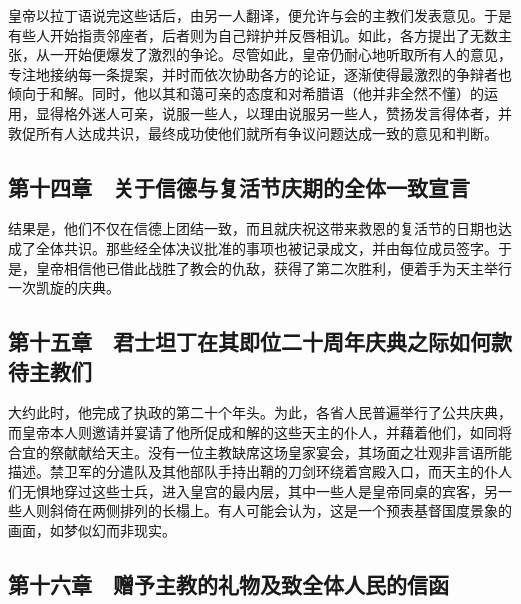 皇帝以拉丁语说完这些话后，由另一人翻译，便允许与会的主教们发表意见。于是有些人开始指责邻座者，后者则为自己辩护并反唇相讥。如此，各方提出了无数主张，从一开始便爆发了激烈的争论。尽管如此，皇帝仍耐心地听取所有人的意见，专注地接纳每一条提案，并时而依次协助各方的论证，逐渐使得最激烈的争辩者也倾向于和解。同时，他以其和蔼可亲的态度和对希腊语（他并非全然不懂）的运用，显得格外迷人可亲，说服一些人，以理由说服另一些人，赞扬发言得体者，并敦促所有人达成共识，最终成功使他们就所有争议问题达成一致的意见和判断。\par


\subsection{第十四章　关于信德与复活节庆期的全体一致宣言}

结果是，他们不仅在信德上团结一致，而且就庆祝这带来救恩的复活节的日期也达成了全体共识。那些经全体决议批准的事项也被记录成文，并由每位成员签字。于是，皇帝相信他已借此战胜了教会的仇敌，获得了第二次胜利，便着手为天主举行一次凯旋的庆典。\par


\subsection{第十五章　君士坦丁在其即位二十周年庆典之际如何款待主教们}

大约此时，他完成了执政的第二十个年头。为此，各省人民普遍举行了公共庆典，而皇帝本人则邀请并宴请了他所促成和解的这些天主的仆人，并藉着他们，如同将合宜的祭献献给天主。没有一位主教缺席这场皇家宴会，其场面之壮观非言语所能描述。禁卫军的分遣队及其他部队手持出鞘的刀剑环绕着宫殿入口，而天主的仆人们无惧地穿过这些士兵，进入皇宫的最内层，其中一些人是皇帝同桌的宾客，另一些人则斜倚在两侧排列的长榻上。有人可能会认为，这是一个预表基督国度景象的画面，如梦似幻而非现实。\par


\subsection{第十六章　赠予主教的礼物及致全体人民的信函}

